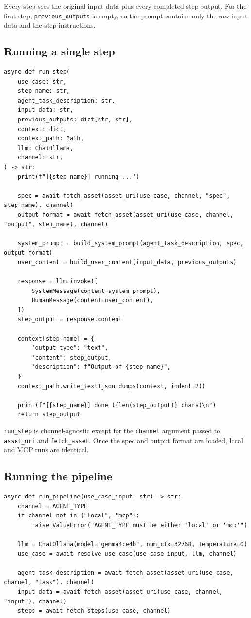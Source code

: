 \documentclass[12pt, a4paper]{article}
\begin{document}
Every step sees the original input data plus every completed step output. For the first step, \texttt{previous\_outputs} is empty, so the prompt contains only the raw input data and the step instructions.

\subsection{Running a single step}

\begin{lstlisting}[style=pythonstyle]
async def run_step(
    use_case: str,
    step_name: str,
    agent_task_description: str,
    input_data: str,
    previous_outputs: dict[str, str],
    context: dict,
    context_path: Path,
    llm: ChatOllama,
    channel: str,
) -> str:
    print(f"[{step_name}] running ...")

    spec = await fetch_asset(asset_uri(use_case, channel, "spec", step_name), channel)
    output_format = await fetch_asset(asset_uri(use_case, channel, "output", step_name), channel)

    system_prompt = build_system_prompt(agent_task_description, spec, output_format)
    user_content = build_user_content(input_data, previous_outputs)

    response = llm.invoke([
        SystemMessage(content=system_prompt),
        HumanMessage(content=user_content),
    ])
    step_output = response.content

    context[step_name] = {
        "output_type": "text",
        "content": step_output,
        "description": f"Output of {step_name}",
    }
    context_path.write_text(json.dumps(context, indent=2))

    print(f"[{step_name}] done ({len(step_output)} chars)\n")
    return step_output
\end{lstlisting}

\texttt{run\_step} is channel-agnostic except for the \texttt{channel} argument passed to \texttt{asset\_uri} and \texttt{fetch\_asset}. Once the spec and output format are loaded, local and MCP runs are identical.

\subsection{Running the pipeline}

\begin{lstlisting}[style=pythonstyle]
async def run_pipeline(use_case_input: str) -> str:
    channel = AGENT_TYPE
    if channel not in {"local", "mcp"}:
        raise ValueError("AGENT_TYPE must be either 'local' or 'mcp'")

    llm = ChatOllama(model="gemma4:e4b", num_ctx=32768, temperature=0)
    use_case = await resolve_use_case(use_case_input, llm, channel)

    agent_task_description = await fetch_asset(asset_uri(use_case, channel, "task"), channel)
    input_data = await fetch_asset(asset_uri(use_case, channel, "input"), channel)
    steps = await fetch_steps(use_case, channel)
\end{lstlisting}
\end{document}
